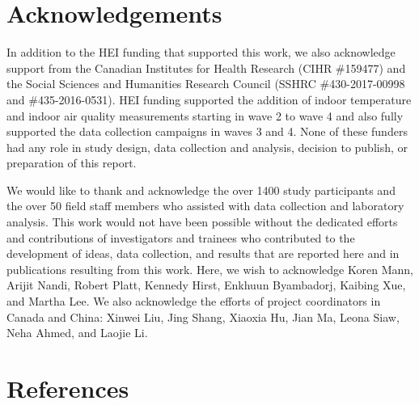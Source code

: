 \documentclass[
  letterpaper,
  DIV=11,
  numbers=noendperiod]{scrartcl}
\begin{document}
\section{Acknowledgements}\label{acknowledgements}

In addition to the HEI funding that supported this work, we also
acknowledge support from the Canadian Institutes for Health Research
(CIHR \#159477) and the Social Sciences and Humanities Research Council
(SSHRC \#430-2017-00998 and \#435-2016-0531). HEI funding
 supported the addition of indoor temperature and indoor
air quality measurements starting in wave 2 to wave 4 and also fully
supported the data collection campaigns in waves 3 and 4. None of these
funders had any role in study design, data collection and analysis,
decision to publish, or preparation of this report.

We would like to thank and acknowledge the over 1400 study participants
and the over 50 field staff members who assisted with data collection
and laboratory analysis. This work would not have been possible without
the dedicated efforts and contributions of investigators and trainees
who contributed to the development of ideas, data collection, and
results that are reported here and in publications resulting from this
work. Here, we wish to acknowledge Koren Mann, Arijit Nandi, Robert
Platt, Kennedy Hirst, Enkhuun Byambadorj, Kaibing Xue, and Martha Lee.
We also acknowledge the efforts of project coordinators in Canada and
China: Xinwei Liu, Jing Shang, Xiaoxia Hu, Jian Ma, Leona Siaw, Neha
Ahmed, and Laojie Li.

\section{References}\label{references}
\end{document}
